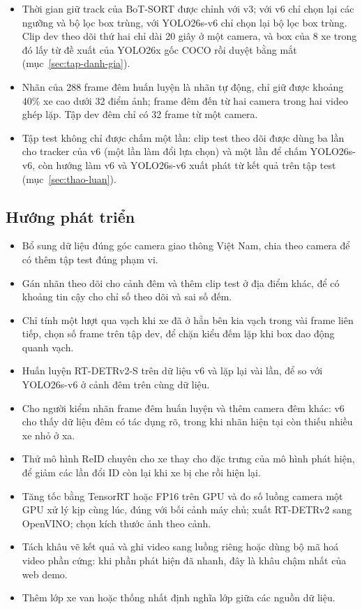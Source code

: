 \begin{itemize}
        đo lại; mới đo một luồng video ở FP32, chưa dùng TensorRT hay FP16 và chưa đo khi nhiều camera chạy cùng lúc.
        RT-DETRv2 chưa được xuất sang OpenVINO.
  \item Thời gian giữ track của BoT-SORT được chỉnh với v3; với v6 chỉ chọn lại các ngưỡng và bộ lọc box trùng, với
        YOLO26s-v6 chỉ chọn lại bộ lọc box trùng. Clip dev theo dõi thứ hai chỉ dài 20 giây ở một camera, và box của 8
        xe trong đó lấy từ đề xuất của YOLO26x gốc COCO rồi duyệt bằng mắt (mục~\ref{sec:tap-danh-gia}).
  \item Nhãn của 288 frame đêm huấn luyện là nhãn tự động, chỉ giữ được khoảng 40\% xe cao dưới 32 điểm ảnh; frame đêm
        đến từ hai camera trong hai video ghép lặp. Tập dev đêm chỉ có 32 frame từ một camera.
  \item Tập test không chỉ được chấm một lần: clip test theo dõi được dùng ba lần cho tracker của v6 (một lần làm đổi
        lựa chọn) và một lần để chấm YOLO26s-v6, còn hướng làm v6 và YOLO26s-v6 xuất phát từ kết quả trên tập test
        (mục~\ref{sec:thao-luan}).
\end{itemize}

\subsection{Hướng phát triển}

\begin{itemize}
  \item Bổ sung dữ liệu đúng góc camera giao thông Việt Nam, chia theo camera để có thêm tập test đúng phạm vi.
  \item Gán nhãn theo dõi cho cảnh đêm và thêm clip test ở địa điểm khác, để có khoảng tin cậy cho chỉ số theo dõi và
        sai số đếm.
  \item Chỉ tính một lượt qua vạch khi xe đã ở hẳn bên kia vạch trong vài frame liên tiếp, chọn số frame trên tập dev,
        để chặn kiểu đếm lặp khi box dao động quanh vạch.
  \item Huấn luyện RT-DETRv2-S trên dữ liệu v6 và lặp lại vài lần, để so với YOLO26s-v6 ở cảnh đêm trên cùng dữ liệu.
  \item Cho người kiểm nhãn frame đêm huấn luyện và thêm camera đêm khác: v6 cho thấy dữ liệu đêm có tác dụng rõ, trong
        khi nhãn hiện tại còn thiếu nhiều xe nhỏ ở xa.
  \item Thử mô hình ReID chuyên cho xe thay cho đặc trưng của mô hình phát hiện, để giảm các lần đổi ID còn lại khi
        xe bị che rồi hiện lại.
  \item Tăng tốc bằng TensorRT hoặc FP16 trên GPU và đo số luồng camera một GPU xử lý kịp cùng lúc, đúng với bối cảnh
        máy chủ; xuất RT-DETRv2 sang OpenVINO; chọn kích thước ảnh theo cảnh.
  \item Tách khâu vẽ kết quả và ghi video sang luồng riêng hoặc dùng bộ mã hoá video phần cứng: khi phần phát hiện đã
        nhanh, đây là khâu chậm nhất của web demo.
  \item Thêm lớp xe van hoặc thống nhất định nghĩa lớp giữa các nguồn dữ liệu.
\end{itemize}
